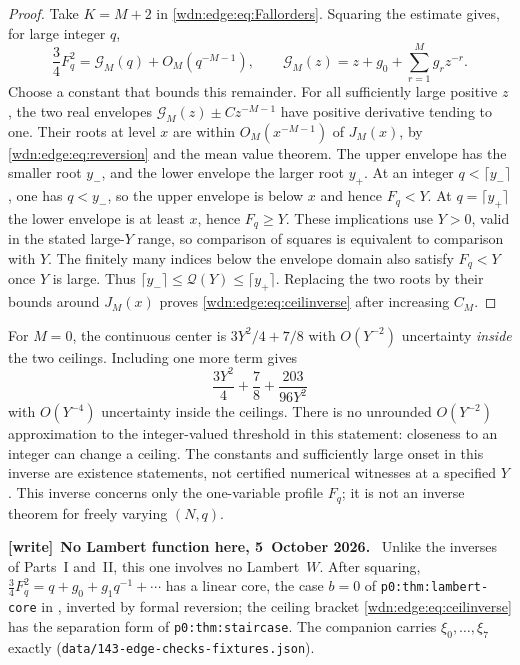 \documentclass[11pt,letterpaper]{article}
\theoremstyle{remark}\newtheorem{remark}[theorem]{Remark}
\newcommand{\file}[1]{\nolinkurl{#1}}
\newenvironment{writenote}[1][]{\par\smallskip\begingroup\small
 \noindent\textbf{[write]}\if\relax\detokenize{#1}\relax\else~\textbf{#1.}\fi\ }%
 {\par\endgroup\smallskip}
\begin{document}
\begin{proof}
Take $K=M+2$ in \eqref{wdn:edge:eq:Fallorders}. Squaring the estimate gives,
for large integer $q$,
\begin{equation}\label{wdn:edge:eq:squareerror}
 \frac34F_q^2=\mathcal G_M(q)+O_M(q^{-M-1}),\qquad
 \mathcal G_M(z)=z+g_0+\sum_{r=1}^M g_rz^{-r}.
\end{equation}
Choose a constant that bounds this remainder. For all sufficiently large
positive $z$, the two real envelopes
$\mathcal G_M(z)\pm C z^{-M-1}$ have positive derivative tending to one.
Their roots at level $x$ are within $O_M(x^{-M-1})$ of $J_M(x)$,
by \eqref{wdn:edge:eq:reversion} and the mean value theorem.
The upper envelope has the smaller root $y_-$, and the lower envelope
the larger root $y_+$. At an integer $q<\lceil y_-\rceil$, one has
$q<y_-$, so the upper envelope is below $x$ and hence $F_q<Y$.
At $q=\lceil y_+\rceil$ the lower envelope is at least $x$, hence
$F_q\ge Y$. These implications use $Y>0$, valid in the stated large-$Y$
range, so comparison of squares is equivalent to comparison with $Y$.
The finitely many indices below the envelope domain also satisfy
$F_q<Y$ once $Y$ is large. Thus
$\lceil y_-\rceil\le\mathcal Q(Y)\le\lceil y_+\rceil$.
Replacing the two roots by their bounds around $J_M(x)$ proves
\eqref{wdn:edge:eq:ceilinverse} after increasing $C_M$.
\end{proof}

For $M=0$, the continuous center is $3Y^2/4+7/8$ with
$O(Y^{-2})$ uncertainty \emph{inside} the two ceilings. Including one
more term gives
\[
 \frac{3Y^2}{4}+\frac78+\frac{203}{96Y^2}
\]
with $O(Y^{-4})$ uncertainty inside the ceilings. There is no unrounded
$O(Y^{-2})$ approximation to the integer-valued threshold in this
statement: closeness to an integer can change a ceiling.
The constants and sufficiently large onset in this inverse are existence
statements, not certified numerical witnesses at a specified $Y$.
This inverse concerns only the one-variable profile $F_q$; it is not
an inverse theorem for freely varying $(N,q)$.

\begin{writenote}[No Lambert function here, 5~October 2026]
Unlike the inverses of Parts~I and~II, this one involves no Lambert~$W$. After squaring, $\frac34F_q^2=q+g_0+g_1q^{-1}+\cdots$ has a linear core, the case $b=0$ of \texttt{p0:thm:lambert-core} in \cite{TSvol}, inverted by formal reversion; the ceiling bracket \eqref{wdn:edge:eq:ceilinverse} has the separation form of \texttt{p0:thm:staircase}. The companion carries $\xi_0,\ldots,\xi_7$ exactly (\file{data/143-edge-checks-fixtures.json}).
\end{writenote}
\end{document}
